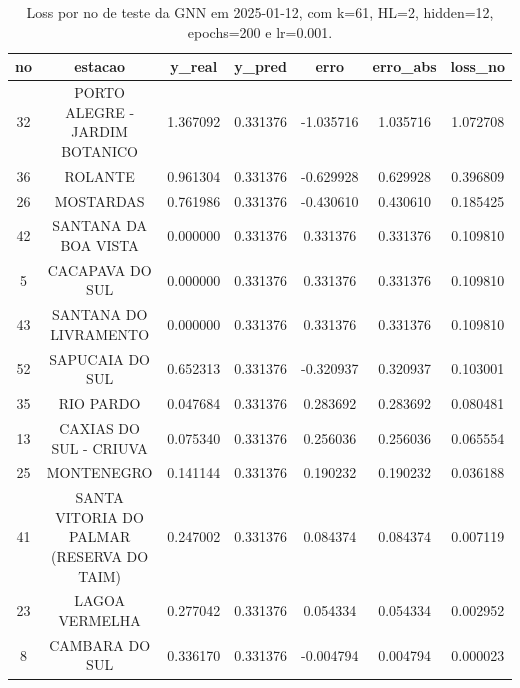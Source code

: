 \begin{table}[h]
\centering
\caption{Loss por no de teste da GNN em 2025-01-12, com k=61, HL=2, hidden=12, epochs=200 e lr=0.001.}
\label{tab:gnn_loss_k61_hl2_h12_e200_d20250112}
\begin{tabular}{ccccccc}
\toprule
no & estacao & y\_real & y\_pred & erro & erro\_abs & loss\_no \\
\midrule
32 & PORTO ALEGRE - JARDIM BOTANICO & 1.367092 & 0.331376 & -1.035716 & 1.035716 & 1.072708 \\
36 & ROLANTE & 0.961304 & 0.331376 & -0.629928 & 0.629928 & 0.396809 \\
26 & MOSTARDAS & 0.761986 & 0.331376 & -0.430610 & 0.430610 & 0.185425 \\
42 & SANTANA DA BOA VISTA & 0.000000 & 0.331376 & 0.331376 & 0.331376 & 0.109810 \\
5 & CACAPAVA DO SUL & 0.000000 & 0.331376 & 0.331376 & 0.331376 & 0.109810 \\
43 & SANTANA DO LIVRAMENTO & 0.000000 & 0.331376 & 0.331376 & 0.331376 & 0.109810 \\
52 & SAPUCAIA DO SUL & 0.652313 & 0.331376 & -0.320937 & 0.320937 & 0.103001 \\
35 & RIO PARDO & 0.047684 & 0.331376 & 0.283692 & 0.283692 & 0.080481 \\
13 & CAXIAS DO SUL - CRIUVA & 0.075340 & 0.331376 & 0.256036 & 0.256036 & 0.065554 \\
25 & MONTENEGRO & 0.141144 & 0.331376 & 0.190232 & 0.190232 & 0.036188 \\
41 & SANTA VITORIA DO PALMAR (RESERVA DO TAIM) & 0.247002 & 0.331376 & 0.084374 & 0.084374 & 0.007119 \\
23 & LAGOA VERMELHA & 0.277042 & 0.331376 & 0.054334 & 0.054334 & 0.002952 \\
8 & CAMBARA DO SUL & 0.336170 & 0.331376 & -0.004794 & 0.004794 & 0.000023 \\
\bottomrule
\end{tabular}
\end{table}
